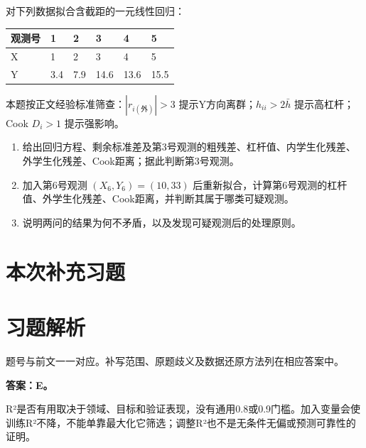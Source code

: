 
对下列数据拟合含截距的一元线性回归：

\begin{center}\small\setlength{\tabcolsep}{5pt}\renewcommand{\arraystretch}{1.18}\begin{tabular}{@{}llllll@{}}
\toprule
观测号 & 1 & 2 & 3 & 4 & 5 \\
\midrule

X & 1 & 2 & 3 & 4 & 5 \\
Y & 3.4 & 7.9 & 14.6 & 13.6 & 15.5 \\
\bottomrule\end{tabular}\end{center}

本题按正文经验标准筛查：\(|r_{i(\text{外})}|>3\) 提示Y方向离群；\(h_{ii}>2\bar h\) 提示高杠杆；Cook \(D_i>1\) 提示强影响。

\begin{enumerate}
\def\labelenumi{\arabic{enumi}.}
\tightlist
\item
  给出回归方程、剩余标准差及第3号观测的粗残差、杠杆值、内学生化残差、外学生化残差、Cook距离；据此判断第3号观测。
\item
  加入第6号观测 \((X_6,Y_6)=(10,33)\) 后重新拟合，计算第6号观测的杠杆值、外学生化残差、Cook距离，并判断其属于哪类可疑观测。
\item
  说明两问的结果为何不矛盾，以及发现可疑观测后的处理原则。
\end{enumerate}



\clearpage\section{本次补充习题}


\clearpage\section{习题解析}

\begin{keyidea}[核对方式]题号与前文一一对应。补写范围、原题歧义及数据还原方法列在相应答案中。\end{keyidea}


\textbf{答案：E。}

R²是否有用取决于领域、目标和验证表现，没有通用0.8或0.9门槛。加入变量会使训练R²不降，不能单靠最大化它筛选；调整R²也不是无条件无偏或预测可靠性的证明。


